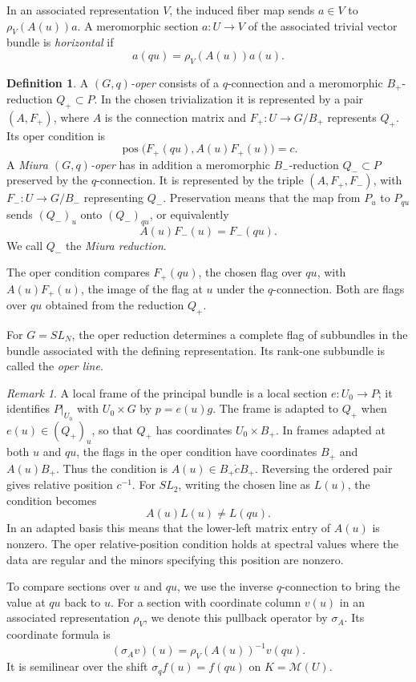 \documentclass[11pt,leqno]{amsart}
\numberwithin{equation}{section}
\theoremstyle{plain}
\theoremstyle{definition}
\newtheorem{definition}[theorem]{Definition}
\theoremstyle{plain}
\theoremstyle{definition}
\theoremstyle{remark}
\newtheorem{remark}[theorem]{Remark}
\begin{document}
In an associated representation $V$, the induced fiber map sends $a\in V$ to $\rho_V(A(u))a$.  A meromorphic section $a:U\to V$ of the associated trivial vector bundle is \emph{horizontal} if
\[
 a(qu)=\rho_V(A(u))a(u).
\]
\begin{definition}\label{def:local-twisted-Miura-qoper}
A \emph{$(G,q)$-oper} consists of a $q$-connection and a meromorphic $B_+$-reduction $Q_+\subset P$.  In the chosen trivialization it is represented by a pair $(A,F_+)$, where $A$ is the connection matrix and $F_+:U\to G/B_+$ represents $Q_+$.  Its oper condition is
\[
 \operatorname{pos}\bigl(F_+(qu),A(u)F_+(u)\bigr)=c.
\]
A \emph{Miura $(G,q)$-oper} has in addition a meromorphic $B_-$-reduction $Q_-\subset P$ preserved by the $q$-connection.  It is represented by the triple $(A,F_+,F_-)$, with $F_-:U\to G/B_-$ representing $Q_-$.  Preservation means that the map from $P_u$ to $P_{qu}$ sends $(Q_-)_u$ onto $(Q_-)_{qu}$, or equivalently
\[
 A(u)F_-(u)=F_-(qu).
\]
We call $Q_-$ the \emph{Miura reduction}.
\end{definition}
The oper condition compares $F_+(qu)$, the chosen flag over $qu$, with $A(u)F_+(u)$, the image of the flag at $u$ under the $q$-connection.  Both are flags over $qu$ obtained from the reduction $Q_+$.

For $G=SL_N$, the oper reduction determines a complete flag of subbundles in the bundle associated with the defining representation. Its rank-one subbundle is called the \emph{oper line}.

\begin{remark}\label{rem:adapted-oper-frames}
A local frame of the principal bundle is a local section $e:U_0\to P$; it identifies $P|_{U_0}$ with $U_0\times G$ by $p=e(u)g$.  The frame is adapted to $Q_+$ when $e(u)\in(Q_+)_u$, so that $Q_+$ has coordinates $U_0\times B_+$.  In frames adapted at both $u$ and $qu$, the flags in the oper condition have coordinates $B_+$ and $A(u)B_+$.  Thus the condition is $A(u)\in B_+\dot cB_+$.  Reversing the ordered pair gives relative position $c^{-1}$.  For $SL_2$, writing the chosen line as $L(u)$, the condition becomes
\[
 A(u)L(u)\ne L(qu).
\]
In an adapted basis this means that the lower-left matrix entry of $A(u)$ is nonzero.
The oper relative-position condition holds at spectral values where the data are regular and the minors specifying this position are nonzero.
\end{remark}

To compare sections over $u$ and $qu$, we use the inverse $q$-connection to bring the value at $qu$ back to $u$. For a section with coordinate column $v(u)$ in an associated representation $\rho_V$, we denote this pullback operator by $\sigma_A$. Its coordinate formula is
\[
 (\sigma_A v)(u)=\rho_V(A(u))^{-1}v(qu).
\]
It is semilinear over the shift $\sigma_q f(u)=f(qu)$ on $K=\mathcal M(U)$.
\end{document}
